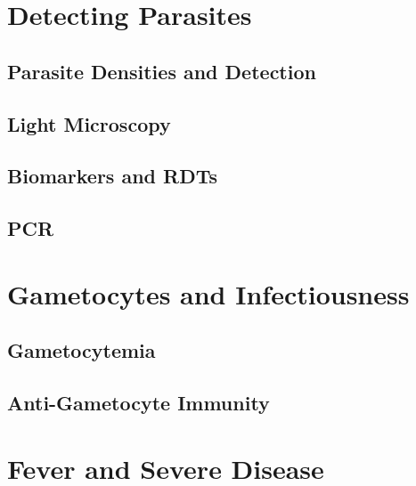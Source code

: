 \documentclass[
]{book}
\begin{document}
\hypertarget{detecting-parasites}{%
\chapter{Detecting Parasites}\label{detecting-parasites}}

\hypertarget{parasite-densities-and-detection}{%
\section{Parasite Densities and Detection}\label{parasite-densities-and-detection}}

\hypertarget{light-microscopy}{%
\section{Light Microscopy}\label{light-microscopy}}

\hypertarget{biomarkers-and-rdts}{%
\section{Biomarkers and RDTs}\label{biomarkers-and-rdts}}

\hypertarget{pcr}{%
\section{PCR}\label{pcr}}

\hypertarget{gametocytes-and-infectiousness-1}{%
\chapter{Gametocytes and Infectiousness}\label{gametocytes-and-infectiousness-1}}

\hypertarget{gametocytemia}{%
\section{Gametocytemia}\label{gametocytemia}}

\hypertarget{anti-gametocyte-immunity}{%
\section{Anti-Gametocyte Immunity}\label{anti-gametocyte-immunity}}

\hypertarget{fever-and-severe-disease}{%
\chapter{Fever and Severe Disease}\label{fever-and-severe-disease}}
\end{document}
